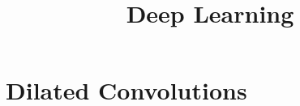 





\newcommand{\titlefigure}{figure/dilatedconv-7.png}
\newcommand{\learninggoals}{
  \item Dilated Convolutions
  \item Transposed Convolutions
}

\title{Deep Learning}
\date{}









\section{Dilated Convolutions}


